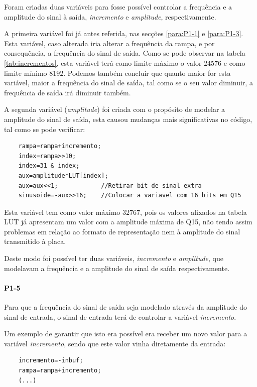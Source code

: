 \documentclass[11pt]{article}
\begin{document}
Foram criadas duas variáveis para fosse possível controlar a frequência e a amplitude do sinal à saída, \textit{incremento} e \textit{amplitude}, respectivamente.

A primeira variável foi já antes referida, nas secções \ref{para:P1-1} e \ref{para:P1-3}. Esta variável, caso alterada iria alterar a frequência da rampa, e por consequência, a frequência do sinal de saída. Como se pode observar na tabela \ref{tab:incrementos}, esta variável terá como limite máximo o valor $ 24576 $ e como limite mínimo $ 8192 $. Podemos também concluir que quanto maior for esta variável, maior a frequência do sinal de saída, tal como se o seu valor diminuir, a frequência de saída irá diminuir também.

A segunda variável (\textit{amplitude}) foi criada com o propósito de modelar a amplitude do sinal de saída, esta causou mudanças mais significativas no código, tal como se pode verificar:

\begin{lstlisting}
	rampa=rampa+incremento;
	index=rampa>>10;
	index=31 & index;        
	aux=amplitude*LUT[index];
	aux=aux<<1;            //Retirar bit de sinal extra
	sinusoide=-aux>>16;    //Colocar a variavel com 16 bits em Q15
\end{lstlisting}

Esta variável tem como valor máximo $ 32767 $, pois os valores afixados na tabela LUT já apresentam um valor com a amplitude máxima de Q15, não tendo assim problemas em relação ao formato de representação nem à amplitude do sinal transmitido à placa.

Deste modo foi possível ter duas variáveis, \textit{incremento} e \textit{amplitude}, que modelavam a frequência e a amplitude do sinal de saída respectivamente.

\paragraph{P1-5}
\label{para:P1-5}

Para que a frequência do sinal de saída seja modelado através da amplitude do sinal de entrada, o sinal de entrada terá de controlar a variável \textit{incremento}.

Um exemplo de garantir que isto era possível era receber um novo valor para a variável \textit{incremento}, sendo que este valor vinha diretamente da entrada:

\begin{lstlisting}
	incremento=-inbuf;
	rampa=rampa+incremento;
	(...)
\end{lstlisting}
\end{document}
